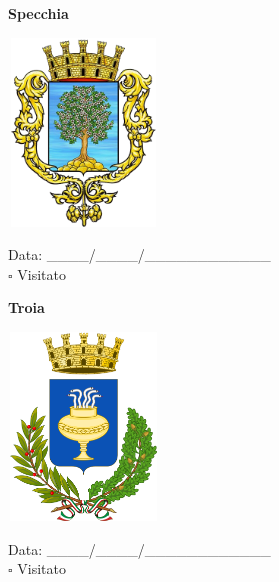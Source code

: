 \documentclass[a5paper,12pt]{article}
\begin{document}
\newpage

\noindent
\begin{minipage}[t]{0.45\textwidth}
    \begin{center}
        \textbf{Specchia}
    \end{center}
    \vspace{-0.5cm} %
    \begin{center}
        \includegraphics[height= 5cm, width=4cm]{Puglia/Stemma Specchia.png}
    \end{center}
    \vspace{-0.4cm} %
    \begin{flushleft}
        Data: \_\_\_\_/\_\_\_\_/\_\_\_\_\_\_\_\_\_\_\_\_ \\
        $\square$ Visitato
    \end{flushleft}
\end{minipage}
\hfill
\noindent
\begin{minipage}[t]{0.45\textwidth}
    \begin{center}
        \textbf{Troia}
    \end{center}
    \vspace{-0.5cm} %
    \begin{center}
        \includegraphics[height= 5cm, width=4cm]{Puglia/Stemma Troia.png}
    \end{center}
    \vspace{-0.4cm} %
    \begin{flushleft}
        Data: \_\_\_\_/\_\_\_\_/\_\_\_\_\_\_\_\_\_\_\_\_ \\
        $\square$ Visitato
    \end{flushleft}
\end{minipage}
\end{document}
